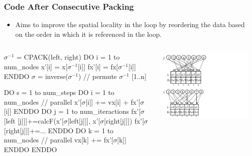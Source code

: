 \documentclass{beamer}
\newcommand{\emp}[1]{\textcolor{DikuRed}{ #1}}
\newcommand{\emphh}[1]{\textcolor{CosGreen}{ #1}}
\newcommand{\mymath}[1]{$ #1 $}
\newcommand{\myindx}[1]{_{#1}}
\newcommand{\myindu}[1]{^{#1}}
\begin{document}
\begin{frame}[fragile,t]
  \frametitle{Code After Consecutive Packing}

\begin{itemize}
    \item Aims to improve the \emphh{spatial locality} in the loop
            by reordering the data based on the order in which it is
            referenced in the loop.
\end  {itemize}


\begin{columns}
\begin{colorcode}
\mymath{\sigma\myindu{-1}} = CPACK(left, right)
DO i = 1 to num_nodes
   x'[i] =  x[\mymath{\sigma\myindu{-1}}[i]]
  fx'[i] = fx[\mymath{\sigma\myindu{-1}}[i]]
ENDDO
\mymath{\sigma} = inverse(\mymath{\sigma\myindu{-1}}) // \emp{permute \mymath{\sigma\myindu{-1}} [1..n]}

DO s = 1 to num_steps
  DO i = 1 to num_nodes  // parallel
    \alert{x'[\mymath{\sigma}[i]]} += \emphh{vx[i]} + \alert{fx'[\mymath{\sigma}[i]]}
  ENDDO
  DO j = 1 to num_iteractions
    \emphh{fx'[\mymath{\sigma}[left [j]]]+=calcF(x'[\mymath{\sigma}[left[j]]],}
                            \emphh{x'[\mymath{\sigma}[right[j]]])}
    \emphh{fx'[\mymath{\sigma}[right[j]]]+=...}
  ENDDO
  DO k = 1 to num_nodes // parallel
    \emphh{vx[k]} += \alert{fx'[\mymath{\sigma}[k]]}
  ENDDO
ENDDO
\end{colorcode}
\includegraphics[width=53ex]{Figures/DataReordering1}
\end{columns}
\end{frame}
\end{document}
